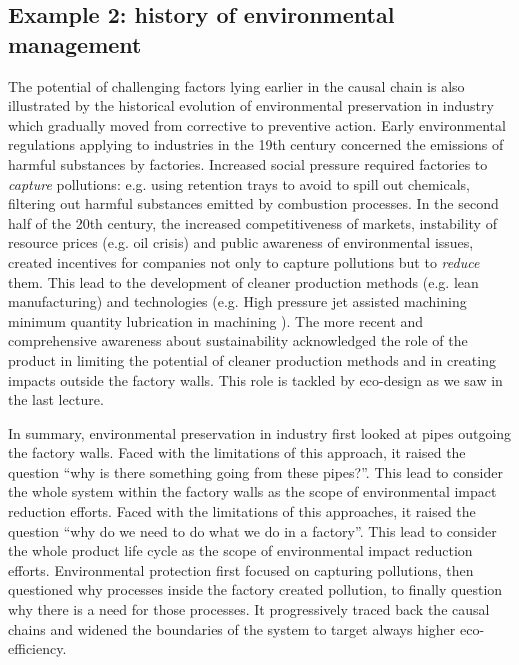 \documentclass{article}
\begin{document}
\subsection{Example 2: history of environmental management}
\label{sec:endofpipe}
The potential of challenging factors lying earlier in the causal chain is also illustrated by the historical evolution of environmental preservation in industry which gradually moved from corrective to preventive action. Early environmental regulations applying to industries in the 19th century concerned the emissions of harmful substances by factories. Increased social pressure required factories to \emph{capture} pollutions: e.g. using retention trays to avoid to spill out chemicals, filtering out harmful substances emitted by combustion processes. In the second half of the 20th century, the increased competitiveness of markets, instability of resource prices (e.g. oil crisis) and public awareness of environmental issues, created incentives for companies not only to capture pollutions but to \emph{reduce} them. This lead to the development of cleaner production methods (e.g. lean manufacturing) and technologies (e.g. High pressure jet assisted machining \cite{pusavecTransitioningSustainableProduction2010} minimum quantity lubrication in machining \cite{lawalCriticalAssessmentLubrication2013}). The more recent and comprehensive awareness about sustainability acknowledged the role of the product in limiting the potential of cleaner production methods and in creating impacts outside the factory walls. This role is tackled by eco-design as we saw in the last lecture. 

In summary, environmental preservation in industry first looked at pipes outgoing the factory walls. Faced with the limitations of this approach, it raised the question ``why is there something going from these pipes?''. This lead to consider the whole system within the factory walls as the scope of environmental impact reduction efforts. Faced with the limitations of this approaches, it raised the question ``why do we need to do what we do in a factory''. This lead to consider the whole product life cycle as the scope of environmental impact reduction efforts. Environmental protection first focused on capturing pollutions, then questioned why processes inside the factory created pollution, to finally question why there is a need for those processes. It progressively traced back the causal chains and widened the boundaries of the system to target always higher eco-efficiency. 
\end{document}
